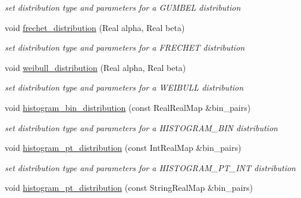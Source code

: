 \begin{DoxyCompactItemize}
\begin{DoxyCompactList}\small\item\em set distribution type and parameters for a G\+U\+M\+B\+EL distribution \end{DoxyCompactList}\item 
void \hyperlink{classPecos_1_1NumericGenOrthogPolynomial_ade2a656052c3e7822d99e007b0793f98}{frechet\+\_\+distribution} (Real alpha, Real beta)\label{classPecos_1_1NumericGenOrthogPolynomial_ade2a656052c3e7822d99e007b0793f98}

\begin{DoxyCompactList}\small\item\em set distribution type and parameters for a F\+R\+E\+C\+H\+ET distribution \end{DoxyCompactList}\item 
void \hyperlink{classPecos_1_1NumericGenOrthogPolynomial_ade0a6ad5814d47eea75c8ebea6db7227}{weibull\+\_\+distribution} (Real alpha, Real beta)\label{classPecos_1_1NumericGenOrthogPolynomial_ade0a6ad5814d47eea75c8ebea6db7227}

\begin{DoxyCompactList}\small\item\em set distribution type and parameters for a W\+E\+I\+B\+U\+LL distribution \end{DoxyCompactList}\item 
void \hyperlink{classPecos_1_1NumericGenOrthogPolynomial_a5b7f2dbecfc759d1370516a0387c296b}{histogram\+\_\+bin\+\_\+distribution} (const Real\+Real\+Map \&bin\+\_\+pairs)\label{classPecos_1_1NumericGenOrthogPolynomial_a5b7f2dbecfc759d1370516a0387c296b}

\begin{DoxyCompactList}\small\item\em set distribution type and parameters for a H\+I\+S\+T\+O\+G\+R\+A\+M\+\_\+\+B\+IN distribution \end{DoxyCompactList}\item 
void \hyperlink{classPecos_1_1NumericGenOrthogPolynomial_a1ed6582d7b2ecd6216c1675eeeee1e63}{histogram\+\_\+pt\+\_\+distribution} (const Int\+Real\+Map \&bin\+\_\+pairs)\label{classPecos_1_1NumericGenOrthogPolynomial_a1ed6582d7b2ecd6216c1675eeeee1e63}

\begin{DoxyCompactList}\small\item\em set distribution type and parameters for a H\+I\+S\+T\+O\+G\+R\+A\+M\+\_\+\+P\+T\+\_\+\+I\+NT distribution \end{DoxyCompactList}\item 
void \hyperlink{classPecos_1_1NumericGenOrthogPolynomial_a9c2ae33555e991263e00cca0e03b8173}{histogram\+\_\+pt\+\_\+distribution} (const String\+Real\+Map \&bin\+\_\+pairs)\label{classPecos_1_1NumericGenOrthogPolynomial_a9c2ae33555e991263e00cca0e03b8173}


\end{DoxyCompactItemize}
